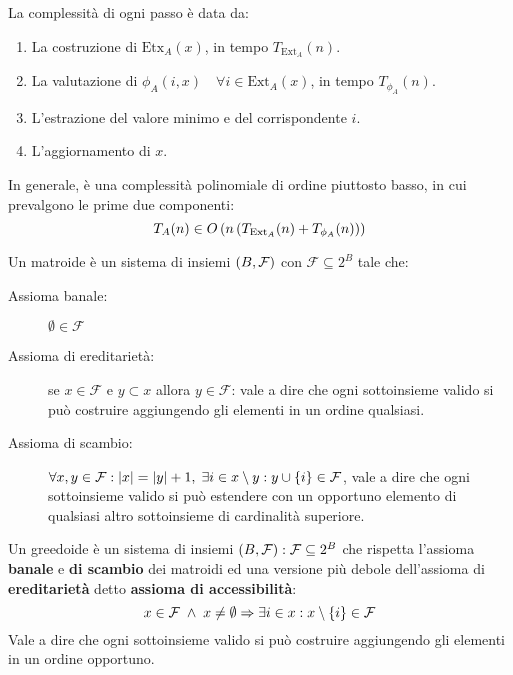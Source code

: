 \documentclass[\main/main.tex]{subfiles}
\providecommand{\f}{\mathcal{F}}
\begin{document}
\begin{complexity}
    La complessità di ogni passo è data da:
    \begin{enumerate}
        \item La costruzione di \(\text{Etx}_A(x)\), in tempo \(T_{\text{Ext}_A}(n)\).
        \item La valutazione di \(\phi_A(i, x) \quad \forall i \in \text{Ext}_A(x)\), in tempo \(T_{\phi_A}(n)\).
        \item L'estrazione del valore minimo e del corrispondente \(i\).
        \item L'aggiornamento di \(x\).
    \end{enumerate}
    In generale, è una complessità polinomiale di ordine piuttosto basso, in cui prevalgono le prime due componenti:
    \[
        T_A(n) \in O\left(n\left(T_{\text{Ext}_A}(n) + T_{\phi_A}(n)\right)\right)
    \]
\end{complexity}
\begin{definition}[Matroide]
Un matroide è un sistema di insiemi \(\rnd{B, \f}\) con \(\f \subseteq 2^{B}\) tale che:
\begin{description}
    \item[Assioma banale:] \(\emptyset \in \f\)
    \item[Assioma di ereditarietà:] se \(x \in \f\) e \(y \subset x\) allora \(y \in \f\): vale a dire che ogni sottoinsieme valido si può costruire aggiungendo gli elementi in un ordine qualsiasi.
    \item[Assioma di scambio:] \( \forall x, y \in \f: \abs{x} = \abs{y} + 1, \; \exists i \in x \setminus y: y \cup \crl{i} \in \f \), vale a dire che ogni sottoinsieme valido si può estendere con un opportuno elemento di qualsiasi altro sottoinsieme di cardinalità superiore.
\end{description}
\end{definition}
\begin{definition}[Greedoide]
Un greedoide è un sistema di insiemi \(\rnd{B, \f}: \f \subseteq 2^B\) che rispetta l'assioma \textbf{banale} e \textbf{di scambio} dei matroidi ed una versione più debole dell'assioma di \textbf{ereditarietà} detto \textbf{assioma di accessibilità}:
\[
    x \in \f \; \land \; x \neq \emptyset \Rightarrow \exists i \in x: x \setminus \crl{i} \in \f
\]
Vale a dire che ogni sottoinsieme valido si può costruire aggiungendo gli elementi in un ordine opportuno.
\end{definition}
\clearpage
\end{document}
